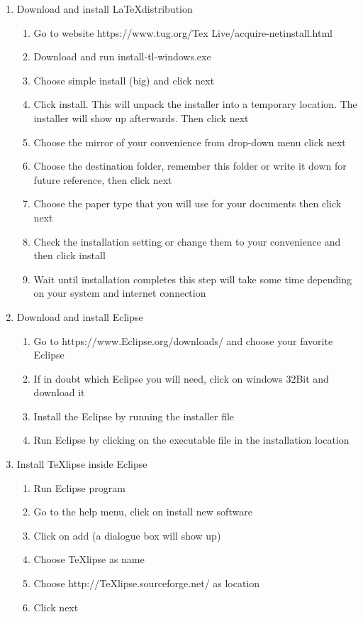 \documentclass{memoir}
\begin{document}
\begin{enumerate}
  \item Download and install \LaTeX  distribution
\begin{enumerate}
  \item Go to website https://www.tug.org/Tex Live/acquire-netinstall.html 
  \item Download and run install-tl-windows.exe
  \item Choose simple install (big) and click next
  \item Click install. This will unpack the installer into a temporary location. The installer will show up afterwards. Then click next
  \item Choose the mirror of your convenience from drop-down menu click next
  \item Choose the destination folder, remember this folder or write it down for future reference, then click next
  \item Choose the paper type that you will use for your documents then click next
  \item Check the installation setting or change them to your convenience and then click install
  \item Wait until installation completes this step will take some time depending on your system and internet connection
\end{enumerate}
\item Download and install Eclipse
\begin{enumerate}
  \item Go to https://www.Eclipse.org/downloads/ and choose your favorite Eclipse
  \item If in doubt which Eclipse you will need, click on windows 32Bit and download it
  \item Install the Eclipse by running the installer file
  \item Run Eclipse by clicking on the executable file in the installation location
\end{enumerate}
  \item Install TeXlipse inside Eclipse
  \begin{enumerate}
    \item Run Eclipse program 
    \item Go to the help menu, click on install new software
    \item Click on add (a dialogue box will show up)
    \item Choose TeXlipse as name
    \item Choose http://TeXlipse.sourceforge.net/ as location
    \item Click next
  \end{enumerate}
  

\end{enumerate}
\end{document}
